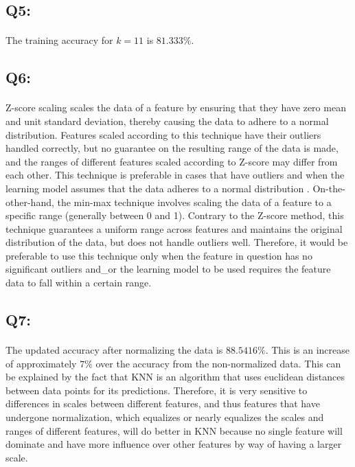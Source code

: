 \documentclass{article}
\begin{document}
\subsection*{Q5:}
    \paragraph*{}
    The training accuracy for $k=11$ is $81.333\%$.

\subsection*{Q6:}
    \paragraph*{}
    Z-score scaling scales the data of a feature by ensuring that they have zero mean and unit standard deviation, thereby causing the data to adhere to a normal distribution. Features scaled according to this technique have their outliers handled correctly, but no guarantee on the resulting range of the data is made, and the ranges of different features scaled according to Z-score may differ from each other. This technique is preferable in cases that have outliers and when the learning model assumes that the data adheres to a normal distribution . On-the-other-hand, the min-max technique involves scaling the data of a feature to a specific range (generally between 0 and 1). Contrary to the Z-score method, this technique guarantees a uniform range across features and maintains the original distribution of the data, but does not handle outliers well. Therefore, it would be preferable to use this technique only when the feature in question has no significant outliers and\_or the learning model to be used requires the feature data to fall within a certain range.
\subsection*{Q7:}
    \paragraph*{}
    The updated accuracy after normalizing the data is $88.5416\%$. This is an increase of approximately $7\%$ over the accuracy from the non-normalized data. This can be explained by the fact that KNN is an algorithm that uses euclidean distances between data points for its predictions. Therefore, it is very sensitive to differences in scales between different features, and thus features that have undergone normalization, which equalizes or nearly equalizes the scales and ranges of different features, will do better in KNN because no single feature will dominate and have more influence over other features by way of having a larger scale.  
\end{document}
